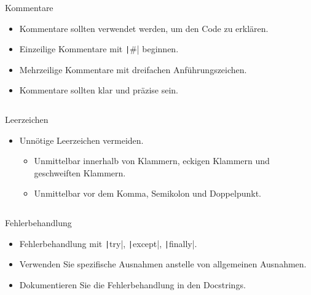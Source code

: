\documentclass[xelatex,aspectratio=169]{beamer}
\begin{document}
\begin{frame}{Kommentare}
    \begin{itemize}
        \item Kommentare sollten verwendet werden, um den Code zu erklären.
        \item Einzeilige Kommentare mit \texttt|\#| beginnen.
        \item Mehrzeilige Kommentare mit dreifachen Anführungszeichen.
        \item Kommentare sollten klar und präzise sein.
    \end{itemize}
    \inputminted{python}{src/style_comments.py}

\end{frame}

\begin{frame}{Leerzeichen}
    \begin{itemize}
        \item Unnötige Leerzeichen vermeiden.
              \begin{itemize}
                  \item Unmittelbar innerhalb von Klammern, eckigen Klammern und geschweiften Klammern.
                  \item Unmittelbar vor dem Komma, Semikolon und Doppelpunkt.
              \end{itemize}
    \end{itemize}
    \inputminted{python}{src/style_whitespace.py}
\end{frame}

\begin{frame}{Fehlerbehandlung}
    \begin{itemize}
        \item Fehlerbehandlung mit \texttt|try|, \texttt|except|, \texttt|finally|.
        \item Verwenden Sie spezifische Ausnahmen anstelle von allgemeinen Ausnahmen.
        \item Dokumentieren Sie die Fehlerbehandlung in den Docstrings.
    \end{itemize}
    \inputminted{python}{src/style_error_handling.py}

\end{frame}
\end{document}
